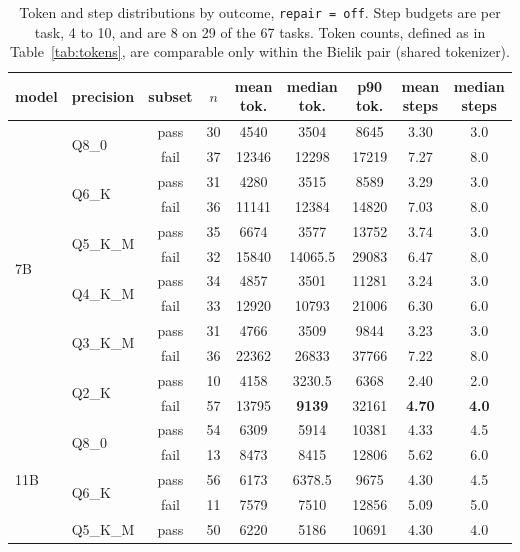 \documentclass[11pt]{article}
\begin{document}
\begin{table}[h]
\centering\small
\caption{Token and step distributions by outcome, \texttt{repair\,=\,off}. Step budgets are per task, 4 to 10, and are 8 on 29 of the 67 tasks. Token counts, defined as in Table~\ref{tab:tokens}, are comparable only within the Bielik pair (shared tokenizer).}
\label{tab:tokens-full}
\begin{tabular}{llccccccc}
\toprule
model & precision & subset & $n$ & mean tok. & median tok. & p90 tok. & mean steps & median steps \\
\midrule
\multirow{12}{*}{7B}
 & \multirow{2}{*}{Q8\_0}   & pass & 30 & 4540  & 3504  & 8645  & 3.30 & 3.0 \\
 &                          & fail & 37 & 12346 & 12298 & 17219 & 7.27 & 8.0 \\
 & \multirow{2}{*}{Q6\_K}   & pass & 31 & 4280  & 3515  & 8589  & 3.29 & 3.0 \\
 &                          & fail & 36 & 11141 & 12384 & 14820 & 7.03 & 8.0 \\
 & \multirow{2}{*}{Q5\_K\_M} & pass & 35 & 6674  & 3577  & 13752 & 3.74 & 3.0 \\
 &                          & fail & 32 & 15840 & 14065.5 & 29083 & 6.47 & 8.0 \\
 & \multirow{2}{*}{Q4\_K\_M} & pass & 34 & 4857  & 3501  & 11281 & 3.24 & 3.0 \\
 &                          & fail & 33 & 12920 & 10793 & 21006 & 6.30 & 6.0 \\
 & \multirow{2}{*}{Q3\_K\_M} & pass & 31 & 4766  & 3509  & 9844  & 3.23 & 3.0 \\
 &                          & fail & 36 & 22362 & 26833 & 37766 & 7.22 & 8.0 \\
 & \multirow{2}{*}{Q2\_K}   & pass & 10 & 4158  & 3230.5  & 6368  & 2.40 & 2.0 \\
 &                          & fail & 57 & 13795 & \textbf{9139} & 32161 & \textbf{4.70} & \textbf{4.0} \\
\midrule
\multirow{12}{*}{11B}
 & \multirow{2}{*}{Q8\_0}   & pass & 54 & 6309 & 5914 & 10381 & 4.33 & 4.5 \\
 &                          & fail & 13 & 8473 & 8415 & 12806 & 5.62 & 6.0 \\
 & \multirow{2}{*}{Q6\_K}   & pass & 56 & 6173 & 6378.5 & 9675  & 4.30 & 4.5 \\
 &                          & fail & 11 & 7579 & 7510 & 12856 & 5.09 & 5.0 \\
 & \multirow{2}{*}{Q5\_K\_M} & pass & 50 & 6220 & 5186 & 10691 & 4.30 & 4.0 \\

\end{tabular}
\end{table}
\end{document}

